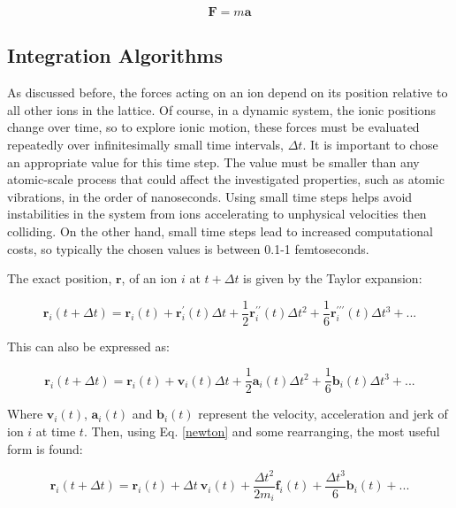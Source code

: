 \documentclass[12pt]{report}
\begin{document}
\begin{equation}
    \textbf{F} = m\textbf{a}
    \label{newton}
\end{equation}

\subsection{Integration Algorithms}

As discussed before, the forces acting on an ion depend on its position relative to all other ions in the lattice.
Of course, in a dynamic system, the ionic positions change over time, so to explore ionic motion, these forces must be evaluated repeatedly over infinitesimally small time intervals, $\Delta t$.
It is important to chose an appropriate value for this time step.
The value must be smaller than any atomic-scale process that could affect the investigated properties, such as atomic vibrations, in the order of nanoseconds.
Using small time steps helps avoid instabilities in the system from ions accelerating to unphysical velocities then colliding.
On the other hand, small time steps lead to increased computational costs, so typically the chosen values is between 0.1-1 femtoseconds.

The exact position, $\textbf{r}$, of an ion $i$ at $t + \Delta t$ is given by the Taylor expansion:

\begin{equation}
    \textbf{r}_i(t + \Delta t) = \textbf{r}_i(t) + \textbf{r}^{\prime}_i(t) \Delta t + \frac{1}{2} \textbf{r}^{\prime\prime}_i(t) \Delta t^2 + \frac{1}{6} \textbf{r}^{\prime\prime\prime}_i(t) \Delta t^3 + ...
    \label{taylor_2}
\end{equation}

\noindent
This can also be expressed as:

\begin{equation}
    \textbf{r}_i(t + \Delta t) = \textbf{r}_i(t) + \textbf{v}_i(t) \Delta t + \frac{1}{2} \textbf{a}_i(t) \Delta t^2 + \frac{1}{6} \textbf{b}_i(t) \Delta t^3 + ...
\end{equation}

\noindent
Where $\textbf{v}_i(t)$, $\textbf{a}_i(t)$ and $\textbf{b}_i(t)$ represent the velocity, acceleration and jerk of ion $i$ at time $t$.
Then, using Eq. \ref{newton} and some rearranging, the most useful form is found:

\begin{equation}
    \textbf{r}_i(t + \Delta t) = \textbf{r}_i(t) + \Delta t \ \textbf{v}_i(t) + \frac{\Delta t^2}{2m_i} \textbf{f}_i(t) + \frac{\Delta t^3}{6} \textbf{b}_i(t) + ...
\end{equation}
\end{document}
